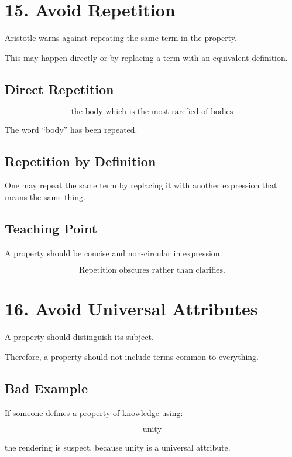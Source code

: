 \documentclass[12pt]{article}
\begin{document}
\section*{15. Avoid Repetition}

Aristotle warns against repeating the same term in the property.

This may happen directly or by replacing a term with an equivalent definition.

\subsection*{Direct Repetition}

\[
\text{the body which is the most rarefied of bodies}
\]

The word ``body'' has been repeated.

\subsection*{Repetition by Definition}

One may repeat the same term by replacing it with another expression that means
the same thing.

\subsection*{Teaching Point}

A property should be concise and non-circular in expression.

\[
\boxed{
\text{Repetition obscures rather than clarifies.}
}
\]

\section*{16. Avoid Universal Attributes}

A property should distinguish its subject.

Therefore, a property should not include terms common to everything.

\subsection*{Bad Example}

If someone defines a property of knowledge using:

\[
\text{unity}
\]

the rendering is suspect, because unity is a universal attribute.
\end{document}
